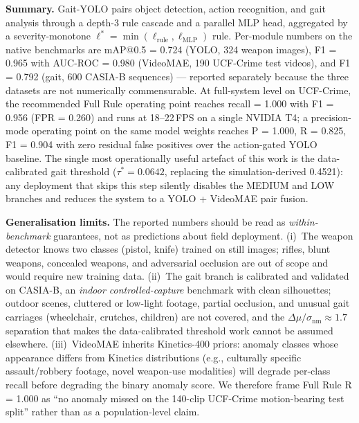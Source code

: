 \documentclass[runningheads]{llncs}
\begin{document}
\begin{algorithm}[!htbp]
\textbf{Summary.} Gait-YOLO pairs object detection, action recognition, and gait analysis through a depth-3 rule cascade and a parallel MLP head, aggregated by a severity-monotone $\ell^*=\min(\ell_\text{rule},\ell_\text{MLP})$ rule. Per-module numbers on the native benchmarks are mAP@0.5 = 0.724 (YOLO, 324 weapon images), F1 = 0.965 with AUC-ROC = 0.980 (VideoMAE, 190 UCF-Crime test videos), and F1 = 0.792 (gait, 600 CASIA-B sequences) --- reported separately because the three datasets are not numerically commensurable. At full-system level on UCF-Crime, the recommended Full Rule operating point reaches recall = 1.000 with F1 = 0.956 (FPR = 0.260) and runs at 18--22\,FPS on a single NVIDIA T4; a precision-mode operating point on the same model weights reaches P = 1.000, R = 0.825, F1 = 0.904 with zero residual false positives over the action-gated YOLO baseline. The single most operationally useful artefact of this work is the data-calibrated gait threshold ($\tau^* = 0.0642$, replacing the simulation-derived 0.4521): any deployment that skips this step silently disables the MEDIUM and LOW branches and reduces the system to a YOLO + VideoMAE pair fusion.

\textbf{Generalisation limits.} The reported numbers should be read as \emph{within-benchmark} guarantees, not as predictions about field deployment. (i)~The weapon detector knows two classes (pistol, knife) trained on still images; rifles, blunt weapons, concealed weapons, and adversarial occlusion are out of scope and would require new training data. (ii)~The gait branch is calibrated and validated on CASIA-B, an \emph{indoor controlled-capture} benchmark with clean silhouettes; outdoor scenes, cluttered or low-light footage, partial occlusion, and unusual gait carriages (wheelchair, crutches, children) are not covered, and the $\Delta\mu/\sigma_\text{nm} \approx 1.7$ separation that makes the data-calibrated threshold work cannot be assumed elsewhere. (iii)~VideoMAE inherits Kinetics-400 priors: anomaly classes whose appearance differs from Kinetics distributions (e.g., culturally specific assault/robbery footage, novel weapon-use modalities) will degrade per-class recall before degrading the binary anomaly score. We therefore frame Full Rule R = 1.000 as ``no anomaly missed on the 140-clip UCF-Crime motion-bearing test split'' rather than as a population-level claim.


\end{algorithm}
\end{document}
